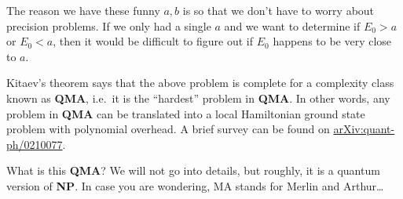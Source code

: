 The reason we have these funny $a, b$ is so that we don't have to worry about precision problems. If we only had a single $a$ and we want to determine if $E_0 > a$ or $E_0 < a$, then it would be difficult to figure out if $E_0$ happens to be very close to $a$.

Kitaev's theorem says that the above problem is complete for a complexity class known as \textbf{QMA}, i.e.\ it is the ``hardest'' problem in \textbf{QMA}. In other words, any problem in \textbf{QMA} can be translated into a local Hamiltonian ground state problem with polynomial overhead. A brief survey can be found on \href{https://arxiv.org/abs/quant-ph/0210077}{arXiv:{}quant-ph/0210077}.

What is this \textbf{QMA}? We will not go into details, but roughly, it is a quantum version of \textbf{NP}. In case you are wondering, MA stands for Merlin and Arthur\ldots
\printindex